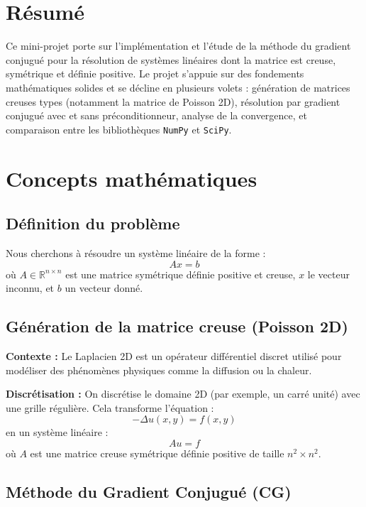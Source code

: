 \documentclass[12pt,a4paper]{article}
\begin{document}
	\newpage
	\section*{Résumé }
	Ce mini-projet porte sur l'implémentation et l'étude de la méthode du gradient conjugué pour la résolution de systèmes linéaires dont la matrice est creuse, symétrique et définie positive. Le projet s'appuie sur des fondements mathématiques solides et se décline en plusieurs volets : génération de matrices creuses types (notamment la matrice de Poisson 2D), résolution par gradient conjugué avec et sans préconditionneur, analyse de la convergence, et comparaison entre les bibliothèques \texttt{NumPy} et \texttt{SciPy}.
	
	\section{Concepts mathématiques}
	
	\subsection{Définition du problème}
	Nous cherchons à résoudre un système linéaire de la forme :
	\begin{equation}
		Ax = b
	\end{equation}
	où $A \in \mathbb{R}^{n \times n}$ est une matrice symétrique définie positive et creuse, $x$ le vecteur inconnu, et $b$ un vecteur donné.

    	\subsection{ Génération de la matrice creuse (Poisson 2D)}
	
	\textbf{Contexte :} Le Laplacien 2D est un opérateur différentiel discret utilisé pour modéliser des phénomènes physiques comme la diffusion ou la chaleur.
	
	\textbf{Discrétisation :} On discrétise le domaine 2D (par exemple, un carré unité) avec une grille régulière. Cela transforme l’équation :
	\[
	- \Delta u(x, y) = f(x, y)
	\]
	en un système linéaire :
	\[
	A u = f
	\]
	où $A$ est une matrice creuse symétrique définie positive de taille $n^2 \times n^2$.
	
	\subsection{ Méthode du Gradient Conjugué (CG)}
	
\end{document}
